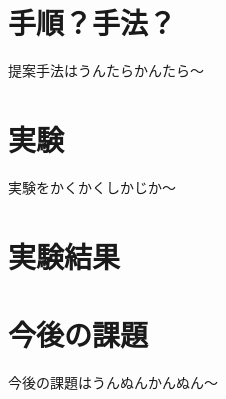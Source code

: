 \documentclass[twocolumn]{jarticle}     %
\begin{document}
\section{手順？手法？}
提案手法はうんたらかんたら〜

\section{実験}
実験をかくかくしかじか〜

\section{実験結果}

\section{今後の課題}
今後の課題はうんぬんかんぬん〜


\end{document}
